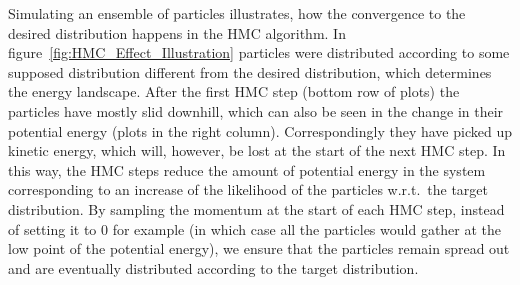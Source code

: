 Simulating an ensemble of particles illustrates, how the convergence to the desired distribution happens in the HMC algorithm. In figure~\ref{fig:HMC_Effect_Illustration} particles were distributed according to some supposed distribution different from the desired distribution, which determines the energy landscape. After the first HMC step (bottom row of plots) the particles have mostly slid downhill, which can also be seen in the change in their potential energy (plots in the right column). Correspondingly they have picked up kinetic energy, which will, however, be lost at the start of the next HMC step. In this way, the HMC steps reduce the amount of potential energy in the system corresponding to an increase of the likelihood of the particles w.r.t.\ the target distribution. By sampling the momentum at the start of each HMC step, instead of setting it to 0 for example (in which case all the particles would gather at the low point of the potential energy), we ensure that the particles remain spread out and are eventually distributed according to the target distribution. 

